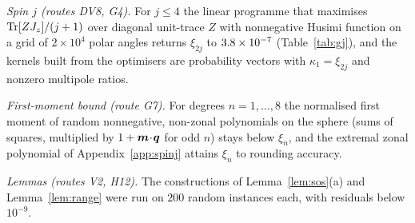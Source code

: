 \emph{Spin $j$ (routes DV8, G4).} For $j\le4$ the linear programme that maximises $\operatorname{Tr}[ZJ_z]/(j+1)$ over diagonal unit-trace $Z$ with nonnegative Husimi function on a grid of $2\times10^4$ polar angles returns $\xi_{2j}$ to $3.8\times 10^{-7}$ (Table~\ref{tab:gj}), and the kernels built from the optimisers are probability vectors with $\kappa_1=\xi_{2j}$ and nonzero multipole ratios.

\emph{First-moment bound (route G7).} For degrees $n=1,\dots,8$ the normalised first moment of random nonnegative, non-zonal polynomials on the sphere (sums of squares, multiplied by $1+\bm{m}\!\cdot\!\bm{q}$ for odd $n$) stays below $\xi_n$, and the extremal zonal polynomial of Appendix~\ref{app:spinj} attains $\xi_n$ to rounding accuracy.

\emph{Lemmas (routes V2, H12).} The constructions of Lemma~\ref{lem:sos}(a) and Lemma~\ref{lem:range} were run on $200$ random instances each, with residuals below $10^{-9}$.
